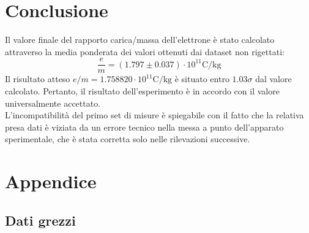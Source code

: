 \documentclass[]{article}
\let\oldsection\section%
\renewcommand{\section}{%
	\renewcommand{\theequation}{\thesection.\arabic{equation}}%
	\oldsection}%
\let\oldsubsection\subsection%
\renewcommand{\subsection}{%
	\renewcommand{\theequation}{\thesubsection.\arabic{equation}}%
	\oldsubsection}%
\begin{document}
    \section{Conclusione}
    Il valore finale del rapporto carica/massa dell'elettrone è stato calcolato attraverso la media ponderata dei valori ottenuti dai dataset non rigettati:
    \begin{equation}
        \label{final-value}
        \frac{e}{m} = ( 1.797 \pm 0.037) \cdot 10^{11}\text{C/kg} 
    \end{equation}
    Il risultato atteso $e/m = 1.758820 \cdot 10^{11}\text{C/kg}$ è situato entro $1.03\sigma$ dal valore calcolato. Pertanto, il risultato dell'esperimento è in accordo con il valore universalmente accettato. \\
    L'incompatibilità del primo set di misure è spiegabile con il fatto che la relativa presa dati è viziata da un errore tecnico nella messa a punto dell'apparato sperimentale, che è stata corretta solo nelle rilevazioni successive.\\
    

    \newpage
    \section{Appendice}
    \subsection{Dati grezzi}
\end{document}
